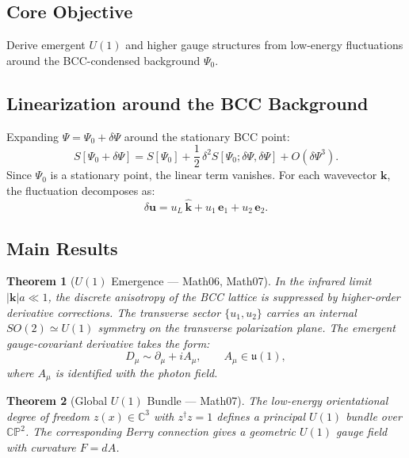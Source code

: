 \documentclass[reprint,aps,pre,onecolumn,superscriptaddress,amsmath,amssymb]{revtex4-2}
\newcommand{\Dmu}{D_{\mu}}
\newtheorem{theorem}{Theorem}[section]
\begin{document}
\subsection{Core Objective}

Derive emergent $U(1)$ and higher gauge structures from low-energy fluctuations
around the BCC-condensed background $\Psi_{0}$.

\subsection{Linearization around the BCC Background}

Expanding $\Psi = \Psi_{0} + \delta\Psi$ around the stationary BCC point:
\begin{equation}
  S[\Psi_{0}+\delta\Psi]
  = S[\Psi_{0}]
  + \frac{1}{2}\,\delta^{2}S[\Psi_{0};\delta\Psi,\delta\Psi]
  + O(\delta\Psi^{3}).
  \label{eq:background-expand}
\end{equation}
Since $\Psi_{0}$ is a stationary point, the linear term vanishes.
For each wavevector $\mathbf{k}$, the fluctuation decomposes as:
\begin{equation}
  \delta\mathbf{u}
  = u_{L}\,\hat{\mathbf{k}}
  + u_{1}\,\mathbf{e}_{1}
  + u_{2}\,\mathbf{e}_{2}.
  \label{eq:fluctuation-decomp}
\end{equation}

\subsection{Main Results}

\begin{theorem}[$U(1)$ Emergence --- Math06, Math07]
  \label{thm:U1}
  In the infrared limit $|\mathbf{k}|a \ll 1$, the discrete anisotropy of the
  BCC lattice is suppressed by higher-order derivative corrections. The
  transverse sector $\{u_{1}, u_{2}\}$ carries an internal
  $SO(2) \simeq U(1)$ symmetry on the transverse polarization plane.
  The emergent gauge-covariant derivative takes the form:
  \begin{equation}
    \Dmu \sim \partial_{\mu} + i A_{\mu},
    \qquad A_{\mu} \in \mathfrak{u}(1),
    \label{eq:U1-covariant}
  \end{equation}
  where $A_{\mu}$ is identified with the photon field.
\end{theorem}

\begin{theorem}[Global $U(1)$ Bundle --- Math07]
  \label{thm:CP2-bundle}
  The low-energy orientational degree of freedom $z(x)\in\mathbb{C}^{3}$
  with $z^{\dagger}z = 1$ defines a principal $U(1)$ bundle over $\mathbb{CP}^{2}$.
  The corresponding Berry connection gives a geometric $U(1)$ gauge field
  with curvature $F = dA$.
\end{theorem}
\end{document}
